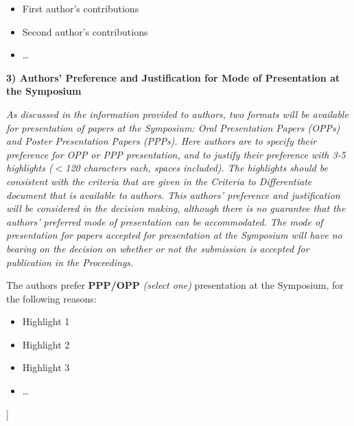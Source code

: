 \documentclass[twocolumn,10pt]{article} %
\begin{document}
\begin{@twocolumnfalse}
\begin{itemize}

  \item{First author's contributions}

  \item{Second author's contributions}

  \item{\ldots}

\end{itemize}

\vspace{10pt}

{\bf 3) Authors' Preference and Justification for Mode of Presentation at the Symposium}
\vspace{10pt} 

{\em
As discussed in the information provided to authors, two formats will be available for presentation of papers at the Symposium: Oral Presentation Papers (OPPs) and Poster Presentation Papers (PPPs). Here authors are to specify their preference for OPP or PPP presentation, and to justify their preference with 3-5 highlights ($<$120 characters each, spaces included). The highlights should be consistent with the criteria that are given in the Criteria to Differentiate document that is available to authors. This authors' preference and justification will be considered in the decision making, although there is no guarantee that the authors' preferred mode of presentation can be accommodated. The mode of presentation for papers accepted for presentation at the Symposium will have no bearing on the decision on whether or not the submission is accepted for publication in the Proceedings.
}

\vspace{10pt}

The authors prefer {\bf PPP/OPP} {\em (select one)} presentation at the Symposium, for the following reasons:

\begin{itemize}

  \item{Highlight 1}

  \item{Highlight 2}

  \item{Highlight 3}

  \item{\ldots}

\end{itemize}

\end{@twocolumnfalse}] 
\end{document}
